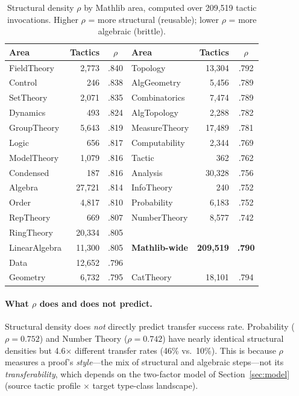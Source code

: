 \documentclass[11pt]{article}
\theoremstyle{definition}
\theoremstyle{remark}
\begin{document}
\begin{table}[ht]
\centering\small
\caption{Structural density $\rho$ by Mathlib area, computed over
  209{,}519 tactic invocations.  Higher $\rho$ = more structural
  (reusable); lower $\rho$ = more algebraic (brittle).}
\label{tab:structural_density}
\begin{tabular}{@{}lrc@{\quad}lrc@{}}
\toprule
Area & Tactics & $\rho$ & Area & Tactics & $\rho$ \\
\midrule
FieldTheory     &  2{,}773 & .840 &
  Topology       & 13{,}304 & .792 \\
Control         &    246 & .838 &
  AlgGeometry    &  5{,}456 & .789 \\
SetTheory       &  2{,}071 & .835 &
  Combinatorics  &  7{,}474 & .789 \\
Dynamics        &    493 & .824 &
  AlgTopology    &  2{,}288 & .782 \\
GroupTheory     &  5{,}643 & .819 &
  MeasureTheory  & 17{,}489 & .781 \\
Logic           &    656 & .817 &
  Computability  &  2{,}344 & .769 \\
ModelTheory     &  1{,}079 & .816 &
  Tactic         &    362 & .762 \\
Condensed       &    187 & .816 &
  Analysis       & 30{,}328 & .756 \\
Algebra         & 27{,}721 & .814 &
  InfoTheory     &    240 & .752 \\
Order           &  4{,}817 & .810 &
  Probability    &  6{,}183 & .752 \\
RepTheory       &    669 & .807 &
  NumberTheory   &  8{,}577 & .742 \\
RingTheory      & 20{,}334 & .805 &
  & & \\
LinearAlgebra   & 11{,}300 & .805 &
  \textbf{Mathlib-wide} & \textbf{209{,}519} & \textbf{.790} \\
Data            & 12{,}652 & .796 &
  & & \\
Geometry        &  6{,}732 & .795 &
  CatTheory      & 18{,}101 & .794 \\
\bottomrule
\end{tabular}
\end{table}

\paragraph{What $\rho$ does and does not predict.}
Structural density does \emph{not} directly predict transfer
success rate.  Probability ($\rho = 0.752$) and Number Theory
($\rho = 0.742$) have nearly identical structural densities but
4.6$\times$ different transfer rates (46\% vs.\ 10\%).  This is
because $\rho$ measures a proof's \emph{style}---the mix of
structural and algebraic steps---not its \emph{transferability},
which depends on the two-factor model of
Section~\ref{sec:model} (source tactic profile $\times$ target
type-class landscape).
\end{document}
